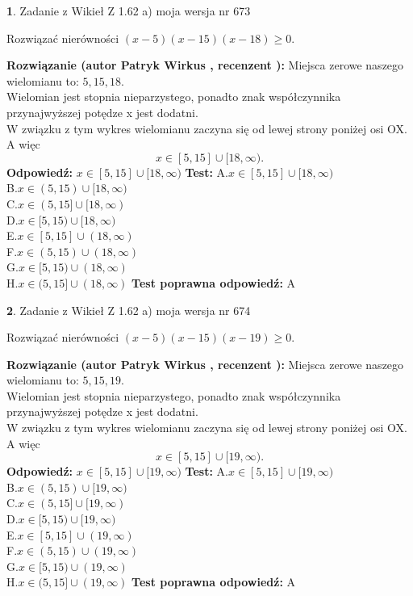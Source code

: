 \documentclass[12pt, a4paper]{article}
\theoremstyle{definition} %
\newtheorem{zad}{}
\newcommand{\zadStart}[1]{\begin{zad}#1\newline}
\newcommand{\zadStop}{\end{zad}}
\newcommand{\rozwStart}[2]{\noindent \textbf{Rozwiązanie (autor #1 , recenzent #2): }\newline}
\newcommand{\rozwStop}{\newline}
\newcommand{\odpStart}{\noindent \textbf{Odpowiedź:}\newline}
\newcommand{\odpStop}{\newline}
\newcommand{\testStart}{\noindent \textbf{Test:}\newline}
\newcommand{\testStop}{\newline}
\newcommand{\kluczStart}{\noindent \textbf{Test poprawna odpowiedź:}\newline}
\newcommand{\kluczStop}{\newline}
\begin{document}
\zadStart{Zadanie z Wikieł Z 1.62 a) moja wersja nr 673}

Rozwiązać nierówności $(x-5)(x-15)(x-18)\ge0$.
\zadStop
\rozwStart{Patryk Wirkus}{}
Miejsca zerowe naszego wielomianu to: $5, 15, 18$.\\
Wielomian jest stopnia nieparzystego, ponadto znak współczynnika przy\linebreak najwyższej potędze x jest dodatni.\\ W związku z tym wykres wielomianu zaczyna się od lewej strony poniżej osi OX. A więc $$x \in [5,15] \cup [18,\infty).$$
\rozwStop
\odpStart
$x \in [5,15] \cup [18,\infty)$
\odpStop
\testStart
A.$x \in [5,15] \cup [18,\infty)$\\
B.$x \in (5,15) \cup [18,\infty)$\\
C.$x \in (5,15] \cup [18,\infty)$\\
D.$x \in [5,15) \cup [18,\infty)$\\
E.$x \in [5,15] \cup (18,\infty)$\\
F.$x \in (5,15) \cup (18,\infty)$\\
G.$x \in [5,15) \cup (18,\infty)$\\
H.$x \in (5,15] \cup (18,\infty)$
\testStop
\kluczStart
A
\kluczStop



\zadStart{Zadanie z Wikieł Z 1.62 a) moja wersja nr 674}

Rozwiązać nierówności $(x-5)(x-15)(x-19)\ge0$.
\zadStop
\rozwStart{Patryk Wirkus}{}
Miejsca zerowe naszego wielomianu to: $5, 15, 19$.\\
Wielomian jest stopnia nieparzystego, ponadto znak współczynnika przy\linebreak najwyższej potędze x jest dodatni.\\ W związku z tym wykres wielomianu zaczyna się od lewej strony poniżej osi OX. A więc $$x \in [5,15] \cup [19,\infty).$$
\rozwStop
\odpStart
$x \in [5,15] \cup [19,\infty)$
\odpStop
\testStart
A.$x \in [5,15] \cup [19,\infty)$\\
B.$x \in (5,15) \cup [19,\infty)$\\
C.$x \in (5,15] \cup [19,\infty)$\\
D.$x \in [5,15) \cup [19,\infty)$\\
E.$x \in [5,15] \cup (19,\infty)$\\
F.$x \in (5,15) \cup (19,\infty)$\\
G.$x \in [5,15) \cup (19,\infty)$\\
H.$x \in (5,15] \cup (19,\infty)$
\testStop
\kluczStart
A
\kluczStop
\end{document}
